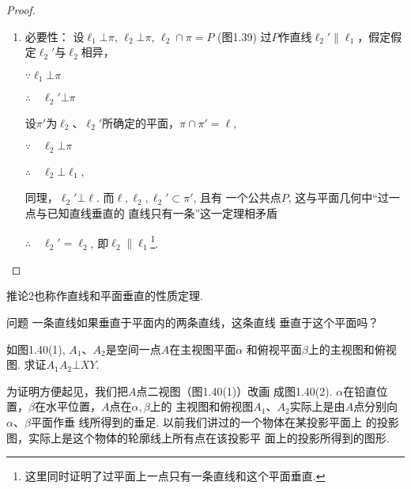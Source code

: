 \begin{proof}
\begin{enumerate}
\begin{figure}[htp]
\begin{minipage}[t]{0.48\textwidth}
\begin{tikzpicture}[>=latex, scale=1]
\end{tikzpicture}
    \caption{}
    \end{minipage}
    \end{figure}
  

  \item 必要性：
  设$ \ell_1\bot \pi$, $ \ell_2\bot \pi$, $\ell_2\cap\pi =P$ (图1.39) 过$P$作直线$\ell_2'\parallel \ell_1$，假定假定$\ell_2'$与$\ell_2$相异，

  $\because \ell_1\bot \pi$

  $\therefore\quad \ell_2'\bot \pi$

  设$\pi'$为$\ell_2$、$\ell_2'$所确定的平面，$\pi\cap \pi'=\ell$,

$\because\quad \ell_2\bot \pi$

$\therefore\quad \ell_2\bot\ell_1$,

同理，$\ell_2'\bot\ell$. 而$\ell,\ell_2,\ell_2'\subset \pi'$, 且有
  一个公共点$P$, 这与平面几何中“过一点与已知直线垂直的
  直线只有一条”这一定理相矛盾
  
$\therefore\quad \ell_2'=\ell_2$, 即$\ell_2\parallel \ell_1$\footnote{这里同时证明了过平面上一点只有一条直线和这个平面垂直. }.
\end{enumerate}
\end{proof}

  推论2也称作直线和平面垂直的性质定理. 

\begin{blk}{问题}
  一条直线如果垂直于平面内的两条直线，这条直线
  垂直于这个平面吗？
\end{blk}

\begin{example}
如图1.40(1), $A_1$、$A_2$是空间一点$A$在主视图平面$\alpha$
和俯视平面$\beta$上的主视图和俯视图. 求证$A_1A_2\bot XY$.

为证明方便起见，我们把$A$点二视图（图1.40(1)）改画
成图1.40(2). $\alpha$在铅直位置，$\beta$在水平位置，$A$点在$\alpha,\beta$上的
主视图和俯视图$A_1$、$A_2$实际上是由$A$点分别向$\alpha$、$\beta$平面作垂
线所得到的垂足. 以前我们讲过的一个物体在某投影平面上
的投影图，实际上是这个物体的轮廓线上所有点在该投影平
面上的投影所得到的图形. 
\end{example}

